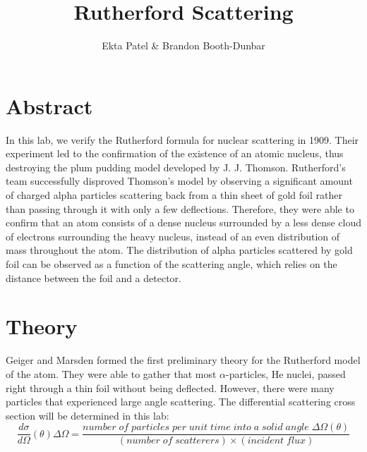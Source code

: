 
\newcommand{\ig}[2][width=4in]{\texttt{[image: \#2]}}    		
\usepackage{graphicx}					
\usepackage{amssymb}
\usepackage{pgfplotstable}
\usepackage{float}
\usepackage{caption}
\captionsetup[table]{justification=justified,singlelinecheck=false, position=bottom}


\header {\today}							
\title{Rutherford Scattering}
\author{Ekta Patel \& Brandon Booth-Dunbar}

\section{Abstract}
\begin{em} In this lab, we verify the Rutherford formula for nuclear scattering in 1909. Their experiment led to the confirmation of the existence of an atomic nucleus, thus destroying the plum pudding model  developed by J. J. Thomson. Rutherford's team successfully disproved Thomson's model by observing a significant amount of charged alpha particles scattering back from a thin sheet of gold foil rather than passing through it with only a few deflections. Therefore, they were able to confirm that an atom consists of a dense nucleus surrounded by a less dense cloud of electrons surrounding the heavy nucleus, instead of an even distribution of mass throughout the atom. The distribution of alpha particles scattered by gold foil can be observed as a function of the scattering angle, which relies on the distance between the foil and a detector. \end {em}

\section{Theory}
Geiger and Marsden formed the first preliminary theory for the Rutherford model of the atom. They were able to gather that most $\alpha$-particles, He nuclei, passed right through a thin foil without being deflected. However, there were many particles that experienced large angle scattering. The differential scattering cross section will be determined in this lab: 
\begin{equation} \frac{d\sigma}{d\Omega}(\theta)\Delta\Omega=\frac{number\;of\; particles\; per\; unit\; time\;into\;a \;solid\; angle\; \Delta\Omega(\theta)}{(number \;of\; scatterers)\times (incident\; flux)} \end{equation}

